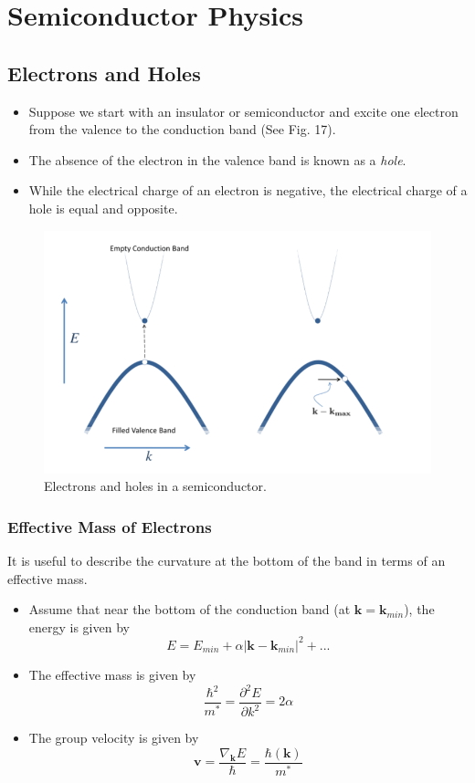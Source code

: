 \documentclass[10pt]{article}
\begin{document}
\section{Semiconductor Physics}
\subsection{Electrons and Holes}
\begin{itemize}
  \item Suppose we start with an insulator or semiconductor and excite one electron from the valence to the conduction band (See Fig. 17).
  \item The absence of the electron in the valence band is known as a \emph{hole}.
  \item While the electrical charge of an electron is negative, the electrical charge of a hole is equal and opposite.
\end{itemize}

\begin{figure}
  \centering
    \includegraphics[width=\textwidth]{tb17}
    \caption{Electrons and holes in a semiconductor.}
\end{figure}

\subsubsection{Effective Mass of Electrons}
It is useful to describe the curvature at the bottom of the band in terms of an effective mass.
\begin{itemize}
  \item Assume that near the bottom of the conduction band (at $\textbf{k} = \textbf{k}_{min}$), the energy is given by
  $$
  E = E_{min} + \alpha|\textbf{k} - \textbf{k}_{min}|^{2} + ...
  $$
  \item The effective mass is given by
  $$
  \frac{\hbar^{2}}{m^{*}} = \frac{\partial^{2}E}{\partial k^{2}} = 2\alpha
  $$
  \item The group velocity is given by
  $$\textbf{v} = \frac{\nabla_{\textbf{k}}E}{\hbar} = \frac{\hbar(\textbf{k})}{m^{*}}$$
\end{itemize}
\end{document}
